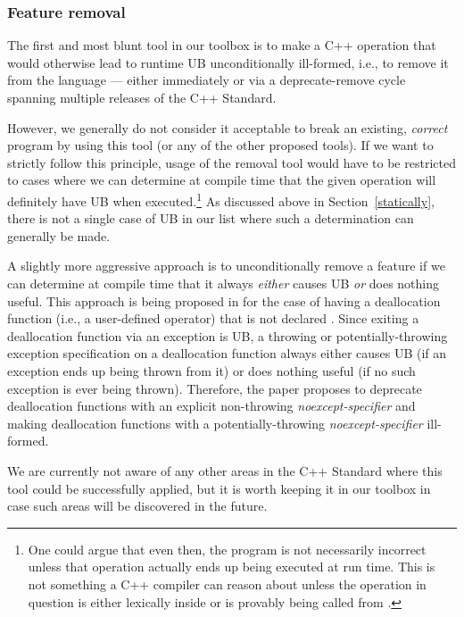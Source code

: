 \subsubsection{Feature removal}
\label{removal}

The first and most blunt tool in our toolbox is to make a C++ operation that would otherwise lead to runtime UB unconditionally ill-formed, i.e., to remove it from the language --- either immediately or via a deprecate-remove cycle spanning multiple releases of the C++ Standard.

However, we generally do not consider it acceptable to break an existing, \emph{correct} program by using this tool (or any of the other proposed tools). If we want to strictly follow this principle, usage of the removal tool would have to be restricted to cases where we can determine at compile time that the given operation will definitely have UB when executed.\footnote{One could argue that even then, the program is not necessarily incorrect unless that operation actually ends up being executed at run time. This is not something a C++ compiler can reason about unless the operation in question is either lexically inside  or is provably being called from .} As discussed above in Section~\ref{statically}, there is not a single case of UB in our list where such a determination can generally be made.

A slightly more aggressive approach is to unconditionally remove a feature if we can determine at compile time that it always \emph{either} causes UB \emph{or} does nothing useful. This approach is being proposed in \cite{P3424R0} for the case of having a deallocation function (i.e., a user-defined  operator) that is not declared . Since exiting a deallocation function via an exception is UB, a throwing or potentially-throwing exception specification on a deallocation function always either causes UB (if an exception ends up being thrown from it) or does nothing useful (if no such exception is ever being thrown). Therefore, the paper proposes to deprecate deallocation functions with an explicit non-throwing \emph{noexcept-specifier} and making deallocation functions with a potentially-throwing \emph{noexcept-specifier} ill-formed.

We are currently not aware of any other areas in the C++ Standard where this tool could be successfully applied, but it is worth keeping it in our toolbox in case such areas will be discovered in the future.

